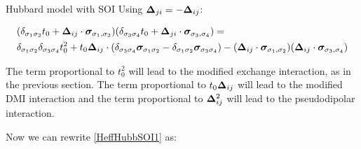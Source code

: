 \begin{section}{Hubbard model with SOI}
Using $\boldsymbol{\Delta}_{ji} = - \boldsymbol{\Delta}_{ij}$:

\begin{align*}
&(\delta_{\sigma_1 \sigma_2}t_0+\boldsymbol{\Delta}_{ij} \cdot\boldsymbol{\sigma}_{\sigma_1, \sigma_2}) (\delta_{\sigma_3 \sigma_4}t_0+\boldsymbol{\Delta}_{ji}\cdot \boldsymbol{\sigma}_{\sigma_3, \sigma_4}) = \\ 
&\delta_{\sigma_1 \sigma_2}\delta_{\sigma_3 \sigma_4}t_0^2 + t_0\boldsymbol{\Delta}_{ij}\cdot(\delta_{\sigma_3 \sigma_4} \boldsymbol{\sigma}_{\sigma_1 \sigma_2} - \delta_{\sigma_1 \sigma_2} \boldsymbol{\sigma}_{\sigma_3 \sigma_4}) - (\boldsymbol{\Delta}_{ij}\cdot\boldsymbol{\sigma}_{\sigma_1, \sigma_2})(\boldsymbol{\Delta}_{ij}\cdot\boldsymbol{\sigma}_{\sigma_3, \sigma_4})
\end{align*}

The term proportional to $t_0^2$ will lead to the modified exchange interaction, as in the previous section. The term proportional to $t_0\boldsymbol{\Delta}_{ij}$ will lead to the modified DMI interaction and the term proportional to $\boldsymbol{\Delta}_{ij}^2$ will lead to the pseudodipolar interaction.

Now we can rewrite \ref{HeffHubbSOI1} as:


\end{section}
